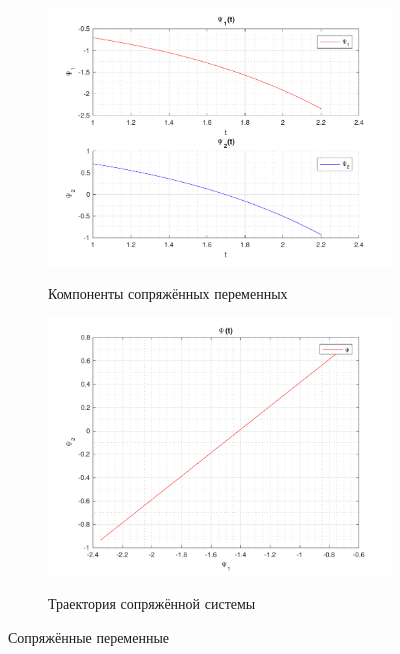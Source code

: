 \documentclass[11pt, oneside, final]{article}
\theoremstyle{break}
\numberwithin{equation}{section}
\theoremstyle{plain}
\theoremstyle{definition}
\begin{document}
    \begin{figure}[H]
        \begin{subfigure}{0.5\linewidth}
            \centering
            \includegraphics[width=\linewidth]{s4fig5}
            \label{pic:s4:5}
            \caption{Компоненты сопряжённых переменных}
        \end{subfigure}
        \begin{subfigure}{0.5\linewidth}
            \centering
            \includegraphics[width=\linewidth]{s4fig6}
            \label{pic:s4:6}
            \caption{Траектория сопряжённой системы}
        \end{subfigure}
        \caption{Сопряжённые переменные}
    \end{figure}
\end{document}
